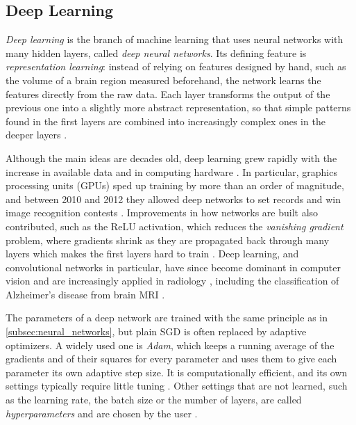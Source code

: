 \subsection{Deep Learning}
\label{subsec:deep_learning}

\emph{Deep learning} is the branch of machine learning that uses neural networks with many hidden layers, called \emph{deep neural networks}. Its defining feature is \emph{representation learning}: instead of relying on features designed by hand, such as the volume of a brain region measured beforehand, the network learns the features directly from the raw data. Each layer transforms the output of the previous one into a slightly more abstract representation, so that simple patterns found in the first layers are combined into increasingly complex ones in the deeper layers \parencite{alzubaidi2021review}.

Although the main ideas are decades old, deep learning grew rapidly with the increase in available data and in computing hardware \parencite{alzubaidi2021review}. In particular, graphics processing units (GPUs) sped up training by more than an order of magnitude, and between 2010 and 2012 they allowed deep networks to set records and win image recognition contests \parencite{schmidhuber2015deep}. Improvements in how networks are built also contributed, such as the ReLU activation, which reduces the \emph{vanishing gradient} problem, where gradients shrink as they are propagated back through many layers which makes the first layers hard to train \parencite{alzubaidi2021review}. Deep learning, and convolutional networks in particular, have since become dominant in computer vision and are increasingly applied in radiology \parencite{yamashita2018convolutional}, including the classification of Alzheimer's disease from brain MRI \parencite{wen2020convolutional}.

The parameters of a deep network are trained with the same principle as in \cref{subsec:neural_networks}, but plain SGD is often replaced by adaptive optimizers. A widely used one is \emph{Adam}, which keeps a running average of the gradients and of their squares for every parameter and uses them to give each parameter its own adaptive step size. It is computationally efficient, and its own settings typically require little tuning \parencite{kingma2015adam}. Other settings that are not learned, such as the learning rate, the batch size or the number of layers, are called \emph{hyperparameters} and are chosen by the user \parencite{yamashita2018convolutional}.

